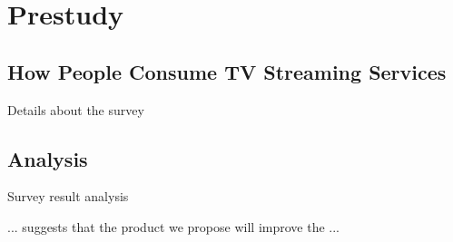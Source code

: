 \section{Prestudy}
\label{sec:prestudy}

\subsection{How People Consume TV Streaming Services}
Details about the survey

\subsection{Analysis}
Survey result analysis

... suggests that the product we propose will improve the ...
